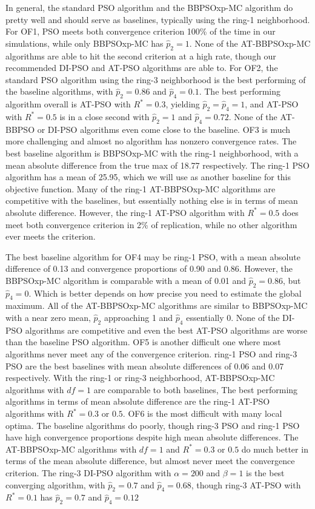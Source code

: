 \documentclass[12pt]{article}
\begin{document}
\begin{appendix}
In general, the standard PSO algorithm and the BBPSOxp-MC algorithm do pretty well and should serve as baselines, typically using the ring-1 neighborhood. For OF1, PSO meets both convergence criterion 100\% of the time in our simulations, while only BBPSOxp-MC has $\widehat{p}_2=1$. None of the AT-BBPSOxp-MC algorithms are able to hit the second criterion at a high rate, though our recommended DI-PSO and AT-PSO algorithms are able to. For OF2, the standard PSO algorithm using the ring-3 neighborhood is the best performing of the baseline algorithms, with $\widehat{p}_2=0.86$ and $\widehat{p}_4=0.1$. The best performing algorithm overall is AT-PSO with $R^*=0.3$, yielding $\widehat{p}_2=\widehat{p}_4=1$, and AT-PSO with $R^*=0.5$ is in a close second with $\widehat{p}_2=1$ and $\widehat{p}_4=0.72$. None of the AT-BBPSO or DI-PSO algorithms even come close to the baseline. OF3 is much more challenging and almost no algorithm has nonzero convergence rates. The best baseline algorithm is BBPSOxp-MC with the ring-1 neighborhood, with a mean absolute difference from the true max of 18.77 respectively. The ring-1 PSO algorithm has a mean of 25.95, which we will use as another baseline for this objective function. Many of the ring-1 AT-BBPSOxp-MC algorithms are competitive with the baselines, but essentially nothing else is in terms of mean absolute difference. However, the ring-1 AT-PSO algorithm with $R^*=0.5$ does meet both convergence criterion in 2\% of replication, while no other algorithm ever meets the criterion. 

The best baseline algorithm for OF4 may be ring-1 PSO, with a mean absolute difference of 0.13 and convergence proportions of 0.90 and 0.86. However, the BBPSOxp-MC algorithm is comparable with a mean of 0.01 and $\widehat{p}_2=0.86$, but $\widehat{p}_4=0$. Which is better depends on how precise you need to estimate the global maximum. All of the AT-BBPSOxp-MC algorithms are similar to BBPSOxp-MC with a near zero mean, $\widehat{p}_2$ approaching 1 and $\widehat{p}_4$ essentially 0. None of the DI-PSO algorithms are competitive and even the best AT-PSO algorithms are worse than the baseline PSO algorithm. OF5 is another difficult one where most algorithms never meet any of the convergence criterion. ring-1 PSO and ring-3 PSO are the best baselines with mean absolute differences of 0.06 and 0.07 respectively. With the ring-1 or ring-3 neighborhood, AT-BBPSOxp-MC algorithms with $df=1$ are comparable to both baselines, The best performing algorithms in terms of mean absolute difference are the ring-1 AT-PSO algorithms with $R^*=0.3$ or $0.5$. OF6 is the most difficult with many local optima. The baseline algorithms do poorly, though ring-3 PSO and ring-1 PSO have high convergence proportions despite high mean absolute differences. The AT-BBPSOxp-MC algorithms with $df=1$ and $R^*=0.3$ or $0.5$ do much better in terms of the mean absolute difference, but almost never meet the convergence criterion. The ring-3 DI-PSO algorithm with $\alpha=200$ and $\beta=1$ is the best converging algorithm, with $\widehat{p}_2=0.7$ and $\widehat{p}_4=0.68$, though ring-3 AT-PSO with $R^*=0.1$ has $\widehat{p}_2=0.7$ and $\widehat{p}_4=0.12$


\end{appendix}
\end{document}
